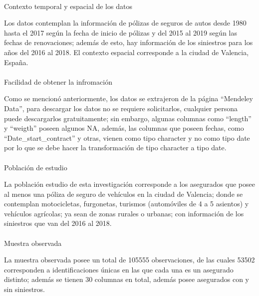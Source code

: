 \documentclass[
  spanish,
  11pt,
  letterpaper,
]{article}
\makeatletter
\let\oldparagraph\paragraph
\renewcommand{\paragraph}{
    \@ifstar
      \xxxParagraphStar
      \xxxParagraphNoStar
  }
\newcommand{\xxxParagraphStar}[1]{\oldparagraph*{#1}\mbox{}}
\newcommand{\xxxParagraphNoStar}[1]{\oldparagraph{#1}\mbox{}}
\makeatother
\begin{document}
\paragraph{Contexto temporal y espacial de los
datos}\label{contexto-temporal-y-espacial-de-los-datos}

Los datos contemplan la información de pólizas de seguros de autos desde
1980 hasta el 2017 según la fecha de inicio de pólizas y del 2015 al
2019 según las fechas de renovaciones; además de esto, hay información
de los siniestros para los años del 2016 al 2018. El contexto espacial
corresponde a la ciudad de Valencia, España.

\paragraph{Facilidad de obtener la
infromación}\label{facilidad-de-obtener-la-infromaciuxf3n}

Como se mencionó anteriormente, los datos se extrajeron de la página
``Mendeley Data'', para descargar los datos no se requiere solicitarlos,
cualquier persona puede descargarlos gratuitamente; sin embargo, algunas
columnas como ``length'' y ``weigth'' poseen algunos NA, además, las
columnas que poseen fechas, como ``Date\_start\_contract'' y otras,
vienen como tipo character y no como tipo date por lo que se debe hacer
la transformación de tipo character a tipo date.

\paragraph{Población de estudio}\label{poblaciuxf3n-de-estudio}

La población estudio de esta investigación corresponde a los asegurados
que posee al menos una póliza de seguro de vehículos en la ciudad de
Valencia; donde se contemplan motocicletas, furgonetas, turismos
(automóviles de 4 a 5 asientos) y vehículos agrícolas; ya sean de zonas
rurales o urbanas; con información de los siniestros que van del 2016 al
2018.

\paragraph{Muestra observada}\label{muestra-observada}

La muestra observada posee un total de 105555 observaciones, de las
cuales 53502 corresponden a identificaciones únicas en las que cada una
es un asegurado distinto; además se tienen 30 columnas en total, además
posee asegurados con y sin siniestros.
\end{document}

